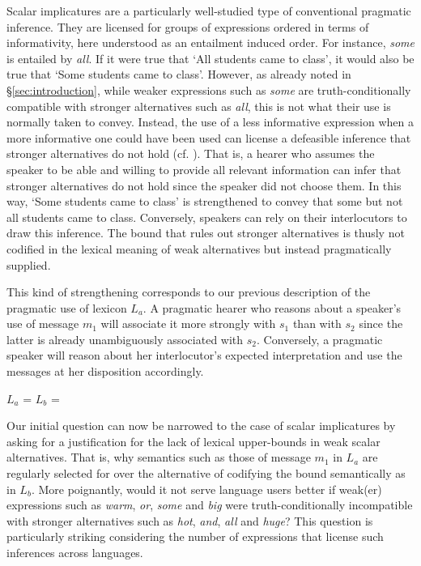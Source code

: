 \documentclass[a4paper]{article}
\begin{document}
Scalar implicatures are a particularly well-studied type of conventional pragmatic inference. They are licensed for groups of expressions ordered in terms of informativity, here understood as an entailment induced order. For instance, {\em some} is entailed by {\em all}. If it were true that `All students came to class', it would also be true that `Some students came to class'. However, as already noted in \S\ref{sec:introduction}, while weaker expressions such as {\em some} are truth-conditionally compatible with stronger alternatives such as {\em all}, this is not what their use is normally taken to convey. Instead, the use of a less informative expression when a more informative one could have been used can license a defeasible inference that stronger alternatives do not hold (cf. \citealt{horn:1972,gazdar:1979}). That is, a hearer who assumes the speaker to be able and willing to provide all relevant information can infer that stronger alternatives do not hold since the speaker did not choose them. In this way, `Some students came to class' is strengthened to convey that some but not all students came to class. Conversely, speakers can rely on their interlocutors to draw this inference. The bound that rules out stronger alternatives is thusly not codified in the lexical meaning of weak alternatives but instead pragmatically supplied.

This kind of strengthening corresponds to our previous description of the pragmatic use of lexicon $L_a$. A pragmatic hearer who reasons about a speaker's use of message $m_1$ will associate it more strongly with $s_1$ than with $s_2$ since the latter is already unambiguously associated with $s_2$. Conversely, a pragmatic speaker will reason about her interlocutor's expected interpretation and use the messages at her disposition accordingly. 

\begin{centering}
$L_a$ =  \hspace{2cm} $L_b$ = \\[0.5cm]
\end{centering}

Our initial question can now be narrowed to the case of scalar implicatures by asking for a justification for the lack of lexical upper-bounds in weak scalar alternatives. That is, why semantics such as those of message $m_1$ in $L_a$ are regularly selected for over the alternative of codifying the bound semantically as in $L_b$. More poignantly, would it not serve language users better if weak(er) expressions such as {\em warm}, {\em or}, {\em some} and {\em big} were truth-conditionally incompatible with stronger alternatives such as {\em hot}, {\em and}, {\em all} and {\em huge}?  This question is particularly striking considering the number of expressions that license such inferences across languages. 
\end{document}
